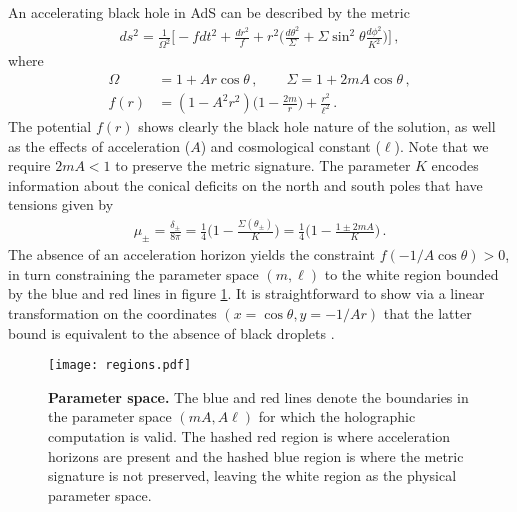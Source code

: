 \documentclass[
twoside,
openright,
frontopenright,
]{dmathesis}
\newcommand{\nn}{\nonumber}
\begin{document}
An accelerating black hole in AdS can be described by the metric
\cite{Hong:2003gx}
\begin{align}\label{AdSC}
ds^2=\frac{1}{\Omega^2}\bigg[ -fdt^2+\frac{dr^2}{f}
+r^2\Big(\frac{d\theta^2}{\Sigma}
+\Sigma\sin^2\!\theta\frac{d\phi^2}{K^2}\Big)\bigg]\,,
\end{align}
where
\begin{align}
\Omega&=1+Ar\cos\theta\,, \qquad  \Sigma= 1+2mA\cos\theta\,, \nn\\
f(r)&=(1-A^2r^2)\bigg(1-\frac{2m}{r}\bigg)+\frac{r^2}{\ell^2}\,.
\end{align}
The potential $f(r)$ shows clearly the black hole nature of the solution,
as well as the effects of acceleration ($A$) and cosmological constant ($\ell$).
Note that we require $2mA<1$ to preserve the
metric signature.  The parameter $K$ encodes
information about the conical deficits on the north and south
poles that have tensions given by~\cite{Appels:2017xoe}
\begin{align}
\label{mueq}
\mu_{\pm}=\frac{\delta_\pm}{8\pi}
=\frac{1}{4}\Big(1-\frac{\Sigma(\theta_\pm)}{K}%
\Big)=\frac{1}{4}\Big(1-\frac{1\pm 2mA}{K}\Big)\,.
\end{align}
The absence of an acceleration horizon yields the constraint
$f(-1/A\cos\theta) > 0$, in turn constraining the parameter space $(m,\ell)$ to
the white region bounded by the blue and red lines in figure \ref{fig:f1}.  It
is straightforward to show via a linear transformation \cite{Hong:2003gx} on the
coordinates $(x=\cos\theta,y=-1/Ar)$ that the latter bound is equivalent to the
absence of black droplets \cite{Hubeny:2009kz}.
\begin{figure}[tbp]
\centering
\texttt{[image: regions.pdf]}
\caption{ \textbf{Parameter space.}  The blue and red lines denote the
  boundaries in the parameter space $(mA,A\ell)$ for which the holographic
  computation is valid.  The hashed red region is where acceleration horizons
  are present and the hashed blue region is where the metric signature is not
  preserved, leaving the white region as the physical parameter space.}
\label{fig:f1}
\end{figure}
\end{document}
